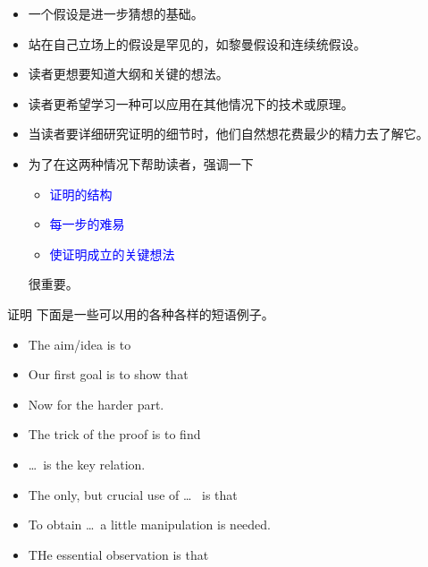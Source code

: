 \documentclass[13pt]{ctexbeamer}
\newcommand{\blue}[1]{\textcolor{blue}{#1}}
\begin{document}
\begin{frame}
\begin{itemize}
\item 一个假设是进一步猜想的基础。
\item 站在自己立场上的假设是罕见的，如黎曼假设和连续统假设。
\end{itemize}
\end{frame}



\begin{frame}
	\begin{itemize}
		\item 读者更想要知道大纲和关键的想法。
		\item 读者更希望学习一种可以应用在其他情况下的技术或原理。
		\item 当读者要详细研究证明的细节时，他们自然想花费最少的精力去了解它。
		\item 为了在这两种情况下帮助读者，强调一下
		\begin{itemize}
		\item \blue{证明的结构}
		\item \blue{每一步的难易}
		\item \blue{使证明成立的关键想法}
		\end{itemize}
		很重要。
		
	\end{itemize}
\end{frame}


\begin{frame}{证明}
下面是一些可以用的各种各样的短语例子。
\begin{itemize}
\item The aim/idea is to 
\item Our first goal is to show that 
\item Now for the harder part.
\item The trick of the proof is to find
\item \dots ~is the key relation.
\item The only, but crucial use of  \dots~ is that 
\item To obtain \dots ~a little manipulation is needed.
\item THe essential observation is that 
\end{itemize}
\end{frame}
\end{document}
